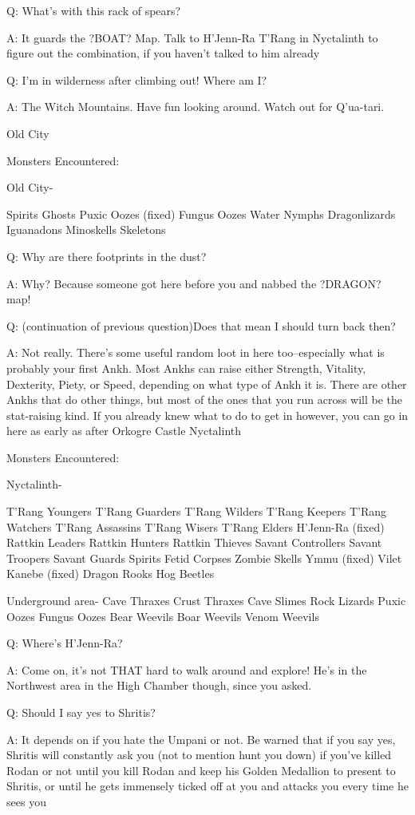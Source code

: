 \documentclass[12pt]{article}
\begin{document}
Q: What's with this rack of spears?

A: It guards the ?BOAT? Map. Talk to H'Jenn-Ra T'Rang in Nyctalinth to
figure out the combination, if you haven't talked to him already

Q: I'm in wilderness after climbing out! Where am I?

A: The Witch Mountains. Have fun looking around. Watch out for
Q'ua-tari.

Old City

Monsters Encountered:

Old City-

Spirits Ghosts Puxic Oozes (fixed) Fungus Oozes Water Nymphs
Dragonlizards Iguanadons Minoskells Skeletons

Q: Why are there footprints in the dust?

A: Why? Because someone got here before you and nabbed the ?DRAGON? map!

Q: (continuation of previous question)Does that mean I should turn back
then?

A: Not really. There's some useful random loot in here too--especially
what is probably your first Ankh. Most Ankhs can raise either Strength,
Vitality, Dexterity, Piety, or Speed, depending on what type of Ankh it
is. There are other Ankhs that do other things, but most of the ones
that you run across will be the stat-raising kind. If you already knew
what to do to get in however, you can go in here as early as after
Orkogre Castle Nyctalinth

Monsters Encountered:

Nyctalinth-

T'Rang Youngers T'Rang Guarders T'Rang Wilders T'Rang Keepers T'Rang
Watchers T'Rang Assassins T'Rang Wisers T'Rang Elders H'Jenn-Ra (fixed)
Rattkin Leaders Rattkin Hunters Rattkin Thieves Savant Controllers
Savant Troopers Savant Guards Spirits Fetid Corpses Zombie Skells Ymmu
(fixed) Vilet Kanebe (fixed) Dragon Rooks Hog Beetles

Underground area- Cave Thraxes Crust Thraxes Cave Slimes Rock Lizards
Puxic Oozes Fungus Oozes Bear Weevils Boar Weevils Venom Weevils

Q: Where's H'Jenn-Ra?

A: Come on, it's not THAT hard to walk around and explore! He's in the
Northwest area in the High Chamber though, since you asked.

Q: Should I say yes to Shritis?

A: It depends on if you hate the Umpani or not. Be warned that if you
say yes, Shritis will constantly ask you (not to mention hunt you down)
if you've killed Rodan or not until you kill Rodan and keep his Golden
Medallion to present to Shritis, or until he gets immensely ticked off
at you and attacks you every time he sees you
\end{document}
